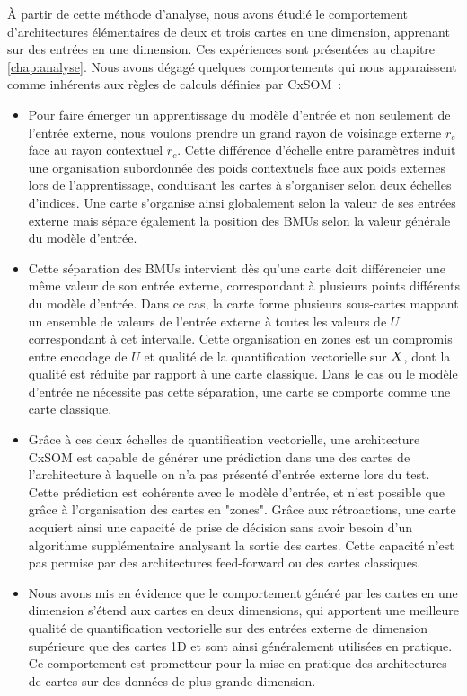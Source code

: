 \`A partir de cette méthode d'analyse, nous avons étudié le comportement d'architectures élémentaires de deux et trois cartes en une dimension, apprenant sur des entrées en une dimension.
Ces expériences sont présentées au chapitre \ref{chap:analyse}.
Nous avons dégagé quelques comportements qui nous apparaissent comme inhérents aux règles de calculs définies par CxSOM~:
\begin{itemize}
    \item Pour faire émerger un apprentissage du modèle d'entrée et non seulement de l'entrée externe, nous voulons prendre un grand rayon de voisinage externe $r_e$ face au rayon contextuel $r_c$. Cette différence d'échelle entre paramètres induit une organisation subordonnée des poids contextuels face aux poids externes lors de l'apprentissage, conduisant les cartes à s'organiser selon deux échelles d'indices. Une carte s'organise ainsi globalement selon la valeur de ses entrées externe mais sépare également la position des BMUs selon la valeur générale du modèle d'entrée.
    \item Cette séparation des BMUs intervient dès qu'une carte doit différencier une même valeur de son entrée externe, correspondant à plusieurs points différents du modèle d'entrée. Dans ce cas, la carte forme plusieurs sous-cartes mappant un ensemble de valeurs de l'entrée externe à toutes les valeurs de $U$ correspondant à cet intervalle. Cette organisation en zones est un compromis entre encodage de $U$ et qualité de la quantification vectorielle sur $X$, dont la qualité est réduite par rapport à une carte classique. Dans le cas ou le modèle d'entrée ne nécessite pas cette séparation, une carte se comporte comme une carte classique.
    \item Grâce à ces deux échelles de quantification vectorielle, une architecture CxSOM est capable de générer une prédiction dans une des cartes de l'architecture à laquelle on n'a pas présenté d'entrée externe lors du test.
    Cette prédiction est cohérente avec le modèle d'entrée, et n'est possible que grâce à l'organisation des cartes en "zones". Grâce aux rétroactions, une carte acquiert ainsi une capacité de prise de décision sans avoir besoin d'un algorithme supplémentaire analysant la sortie des cartes. Cette capacité n'est pas permise par des architectures feed-forward ou des cartes classiques. 
    \item Nous avons mis en évidence que le comportement généré par les cartes en une dimension s'étend aux cartes en deux dimensions, qui apportent une meilleure qualité de quantification vectorielle sur des entrées externe de dimension supérieure que des cartes 1D et sont ainsi généralement utilisées en pratique. Ce comportement est prometteur pour la mise en pratique des architectures de cartes sur des données de plus grande dimension.
\end{itemize}



